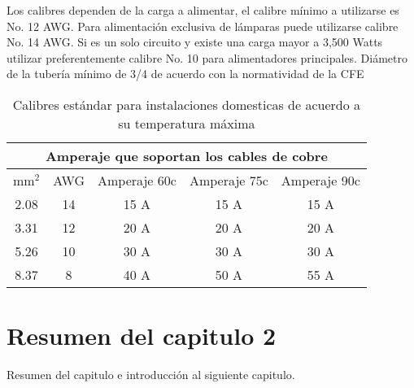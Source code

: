 Los calibres dependen de la carga a alimentar, el calibre mínimo a utilizarse es No. 12 \gls{AWG}. Para alimentación exclusiva de lámparas puede utilizarse calibre No. 14 \gls{AWG}. Si es un solo circuito y existe una carga mayor a 3,500 Watts utilizar preferentemente calibre No. 10 para alimentadores principales. Diámetro de la tubería mínimo de 3/4 de acuerdo con la normatividad de la \gls{CFE}

\begin{table}[H]
\centering
\begin{tabular}{||c c c c c||} 
 \hline
 \multicolumn{5}{|c|}{Amperaje que soportan los cables de cobre} \\
 \hline
 mm$^2$  & AWG & Amperaje 60c& Amperaje 75c & Amperaje 90c \\ [0.5ex] 
 \hline\hline
 2.08 & 14 & 15 A& 15 A & 15 A  \\ 
 3.31 & 12 & 20 A & 20 A & 20 A \\
 5.26 & 10 & 30 A& 30 A & 30 A \\
 8.37 & 8 & 40 A& 50 A & 55 A \\
 \hline
\end{tabular}

\caption{Calibres estándar para instalaciones domesticas de acuerdo a su temperatura máxima }
\label{table:cablibres}
\end{table}

\section{ Resumen del capitulo 2 }

Resumen del capitulo e introducción al siguiente capitulo. 